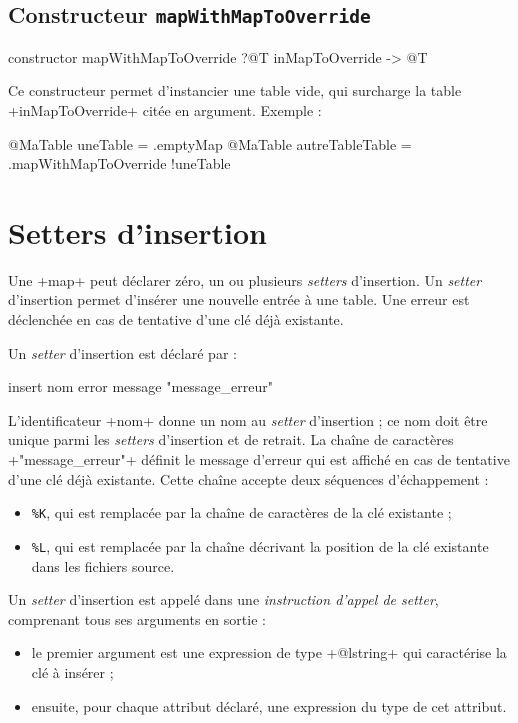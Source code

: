  

\subsection{Constructeur \texttt{mapWithMapToOverride}}

\begin{galgas}
constructor mapWithMapToOverride ?@T inMapToOverride -> @T
\end{galgas}

Ce constructeur permet d'instancier une table vide, qui surcharge la table \ggs+inMapToOverride+ citée en argument. Exemple :
\begin{galgas}
@MaTable uneTable = .emptyMap
@MaTable autreTableTable = .mapWithMapToOverride {!uneTable}
\end{galgas}






\section{Setters d'insertion}

Une \ggs+map+ peut déclarer zéro, un ou plusieurs \emph{setters} d'insertion. Un \emph{setter} d'insertion permet d'insérer une nouvelle entrée à une table. Une erreur est déclenchée en cas de tentative d'une clé déjà existante.


Un \emph{setter} d'insertion est déclaré par :

\begin{galgas}
insert nom error message "message_erreur"
\end{galgas}

L'identificateur \ggs+nom+ donne un nom au \emph{setter} d'insertion ; ce nom doit être unique parmi les \emph{setters} d'insertion et de retrait. La chaîne de caractères \ggs+"message_erreur"+ définit le message d'erreur qui est affiché en cas de tentative d'une clé déjà existante. Cette chaîne accepte deux séquences d'échappement :
\begin{itemize}
  \item \texttt{\%K}, qui est remplacée par la chaîne de caractères de la clé existante ;
  \item \texttt{\%L}, qui est remplacée par la chaîne décrivant la position de la clé existante dans les fichiers source.
\end{itemize}


Un \emph{setter} d'insertion est appelé dans une \emph{instruction d'appel de setter}, comprenant tous ses arguments en sortie :
\begin{itemize}
  \item le premier argument est une expression de type \ggs+@lstring+ qui caractérise la clé à insérer ;
  \item ensuite, pour chaque attribut déclaré, une expression du type de cet attribut.
\end{itemize}

